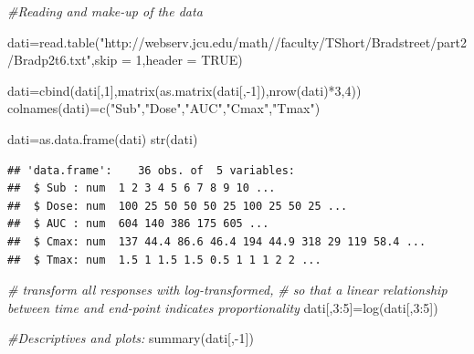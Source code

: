 \documentclass[
]{article}
\newenvironment{Shaded}{\begin{snugshade}}{\end{snugshade}}
\newcommand{\AttributeTok}[1]{\textcolor[rgb]{0.77,0.63,0.00}{#1}}
\newcommand{\CommentTok}[1]{\textcolor[rgb]{0.56,0.35,0.01}{\textit{#1}}}
\newcommand{\ConstantTok}[1]{\textcolor[rgb]{0.00,0.00,0.00}{#1}}
\newcommand{\DecValTok}[1]{\textcolor[rgb]{0.00,0.00,0.81}{#1}}
\newcommand{\FunctionTok}[1]{\textcolor[rgb]{0.00,0.00,0.00}{#1}}
\newcommand{\NormalTok}[1]{#1}
\newcommand{\OtherTok}[1]{\textcolor[rgb]{0.56,0.35,0.01}{#1}}
\newcommand{\SpecialCharTok}[1]{\textcolor[rgb]{0.00,0.00,0.00}{#1}}
\newcommand{\StringTok}[1]{\textcolor[rgb]{0.31,0.60,0.02}{#1}}
\begin{document}
\begin{Shaded}
\begin{Highlighting}[]
\CommentTok{\#Reading and make{-}up of the data}

\NormalTok{dati}\OtherTok{=}\FunctionTok{read.table}\NormalTok{(}\StringTok{"http://webserv.jcu.edu/math//faculty/TShort/Bradstreet/part2/Bradp2t6.txt"}\NormalTok{,}\AttributeTok{skip =} \DecValTok{1}\NormalTok{,}\AttributeTok{header =} \ConstantTok{TRUE}\NormalTok{)}

\NormalTok{dati}\OtherTok{=}\FunctionTok{cbind}\NormalTok{(dati[,}\DecValTok{1}\NormalTok{],}\FunctionTok{matrix}\NormalTok{(}\FunctionTok{as.matrix}\NormalTok{(dati[,}\SpecialCharTok{{-}}\DecValTok{1}\NormalTok{]),}\FunctionTok{nrow}\NormalTok{(dati)}\SpecialCharTok{*}\DecValTok{3}\NormalTok{,}\DecValTok{4}\NormalTok{))}
\FunctionTok{colnames}\NormalTok{(dati)}\OtherTok{=}\FunctionTok{c}\NormalTok{(}\StringTok{"Sub"}\NormalTok{,}\StringTok{"Dose"}\NormalTok{,}\StringTok{"AUC"}\NormalTok{,}\StringTok{"Cmax"}\NormalTok{,}\StringTok{"Tmax"}\NormalTok{)}

\NormalTok{dati}\OtherTok{=}\FunctionTok{as.data.frame}\NormalTok{(dati)}
\FunctionTok{str}\NormalTok{(dati)}
\end{Highlighting}
\end{Shaded}

\begin{verbatim}
## 'data.frame':    36 obs. of  5 variables:
##  $ Sub : num  1 2 3 4 5 6 7 8 9 10 ...
##  $ Dose: num  100 25 50 50 50 25 100 25 50 25 ...
##  $ AUC : num  604 140 386 175 605 ...
##  $ Cmax: num  137 44.4 86.6 46.4 194 44.9 318 29 119 58.4 ...
##  $ Tmax: num  1.5 1 1.5 1.5 0.5 1 1 1 2 2 ...
\end{verbatim}

\begin{Shaded}
\begin{Highlighting}[]
\CommentTok{\# transform all responses with log{-}transformed, }
\CommentTok{\# so that a linear relationship between time and end{-}point indicates proportionality }
\NormalTok{dati[,}\DecValTok{3}\SpecialCharTok{:}\DecValTok{5}\NormalTok{]}\OtherTok{=}\FunctionTok{log}\NormalTok{(dati[,}\DecValTok{3}\SpecialCharTok{:}\DecValTok{5}\NormalTok{])}
\end{Highlighting}
\end{Shaded}

\begin{Shaded}
\begin{Highlighting}[]
\CommentTok{\#Descriptives and plots:}
\FunctionTok{summary}\NormalTok{(dati[,}\SpecialCharTok{{-}}\DecValTok{1}\NormalTok{])}
\end{Highlighting}
\end{Shaded}
\end{document}
